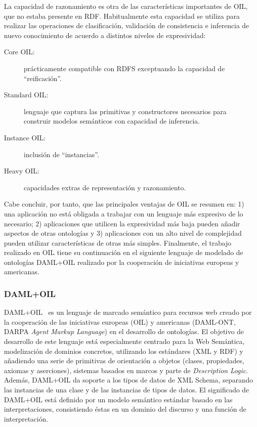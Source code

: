 La capacidad de razonamiento es otra de las características importantes de OIL, que no estaba presente en RDF. Habitualmente esta capacidad se utiliza
para realizar las operaciones de clasificación, validación de consistencia e inferencia de nuevo conocimiento de acuerdo a distintos 
niveles de expresividad: 

\begin{description}
\item[Core OIL:] prácticamente compatible con RDFS exceptuando la capacidad de
``reificación''.
\item[Standard OIL:] lenguaje que captura las primitivas y constructores necesarios para
construir modelos semánticos con capacidad de inferencia.
\item[Instance OIL:] inclusión de ``instancias''.
\item[Heavy OIL:] capacidades extras de representación y razonamiento.
\end{description}

% 

Cabe concluir, por tanto, que las principales ventajas de OIL se resumen en:
1) una aplicación no está obligada a trabajar con un
lenguaje más expresivo de lo necesario; 2) aplicaciones que utilicen la
expresividad más baja pueden añadir aspectos de otras ontologías y 3) aplicaciones con un alto nivel de complejidad pueden utilizar
características de otras más simples. Finalmente, el trabajo realizado en 
OIL tiene su continuación en el siguiente lenguaje de modelado de ontologías \gls{DAML+OIL} 
realizado por la cooperación de iniciativas europeas y americanas.

\subsubsection{DAML+OIL}\label{daml+oil}
\gls{DAML+OIL}~\cite{HM00} es un lenguaje de marcado semántico para recursos web creado por la cooperación de las iniciativas
europeas (OIL) y americanas (DAML-ONT, \gls{DARPA} \textit{Agent Markup Language})
en el desarrollo de ontologías. El objetivo de desarrollo de este lenguaje está
especialmente centrado para la Web Semántica, modelización de dominios concretos,
utilizando los estándares (\gls{XML} y \gls{RDF}) y añadiendo una serie de primitivas de
orientación a objetos (clases, propiedades, axiomas y aserciones),
sistemas basados en marcos y parte de \textit{Description Logic}. Además, 
DAML+OIL da soporte a los tipos de datos de \gls{XML Schema}, separando las instancias
de una clase y de las instancias de tipos de datos. El significado de DAML+OIL
está definido por un modelo semántico estándar basado en las interpretaciones, consistiendo éstas 
en un dominio del discurso y una función de interpretación.

